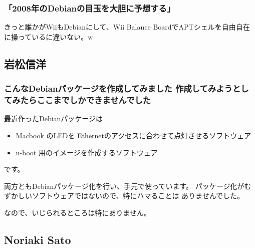 \documentclass[mingoth,a4paper]{jsarticle}
\begin{document}
\subsubsection{「2008年のDebianの目玉を大胆に予想する」}

きっと誰かがWiiもDebianにして、Wii Balance BoardでAPTシェルを自由自在に操っているに違いない。w

\subsection{岩松信洋}


\subsubsection{こんなDebianパッケージを作成してみました
  作成してみようとしてみたらここまでしかできませんでした}

最近作ったDebianパッケージは
\begin{itemize}
 \item  Macbook のLEDを Ethernetのアクセスに合わせて点灯させるソフトウェア
 \item  u-boot 用のイメージを作成するソフトウェア
\end{itemize}
です。

両方ともDebianパッケージ化を行い、手元で使っています。
パッケージ化がむずかしいソフトウェアではないので、特にハマることは
ありませんでした。

なので、いじられるところは特にありません。


\subsection{Noriaki Sato}
\end{document}
